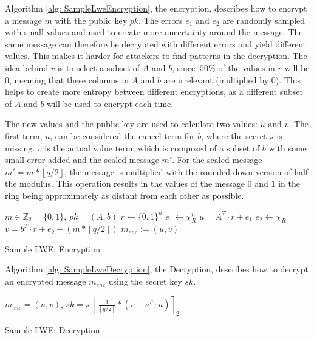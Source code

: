 Algorithm \ref{alg: SampleLweEncryption}, the encryption, describes how to encrypt a message $m$ with the public key $pk$. The errors $e_1$ and $e_2$ are randomly sampled with small values and used to create more uncertainty around the message. The same message can therefore be decrypted with different errors and yield different values. This makes it harder for attackers to find patterns in the decryption. The idea behind $r$ is to select a subset of $A$ and $b$, since $~50\%$ of the values in $r$ will be $0$, meaning that these columns in $A$ and $b$ are irrelevant (multiplied by $0$). This helps to create more entropy between different encryptions, as a different subset of $A$ and $b$ will be used to encrypt each time.

The new values and the public key are used to calculate two values: $u$ and $v$. The first term, $u$, can be considered the cancel term for $b$, where the secret $s$ is missing. $v$ is the actual value term, which is composed of a subset of $b$ with some small error added and the scaled message $m'$. For the scaled message $m' = m*\left\lfloor q/2\right\rfloor$, the message is multiplied with the rounded down version of half the modulus. This operation results in the values of the message $0$ and $1$ in the ring being approximately as distant from each other as possible.

\begin{algorithm}[htb]
  \begin{algorithmic}[1]
    \REQUIRE $m \in \mathbb{Z}_2 = \{0, 1\}$, $pk = (A, b)$
    \STATE $r \leftarrow \{0, 1\}^n$
    \STATE $e_1 \leftarrow \chi_R^n$
    \STATE $u = A^T \cdot r + e_1$
    \STATE $e_2 \leftarrow \chi_R$
    \STATE $v = b^T \cdot r + e_2 + (m*\left\lfloor q/2\right\rfloor)$
    \RETURN $m_{enc} := (u, v)$
  \end{algorithmic}
  \caption{Sample LWE: Encryption}
  \label{alg: SampleLweEncryption}
\end{algorithm}

Algorithm \ref{alg: SampleLweDecryption}, the Decryption, describes how to decrypt an encrypted message $m_{enc}$ using the secret key $sk$.



\begin{algorithm}[htb]
  \begin{algorithmic}[1]
    \REQUIRE $m_{enc} = (u, v)$, $sk = s$
    \RETURN $\left\lfloor \frac{1}{\left\lfloor q/2\right\rfloor}*(v-s^T \cdot u)\right\rceil _2$
  \end{algorithmic}
  \caption{Sample LWE: Decryption}
  \label{alg: SampleLweDecryption}
\end{algorithm}


